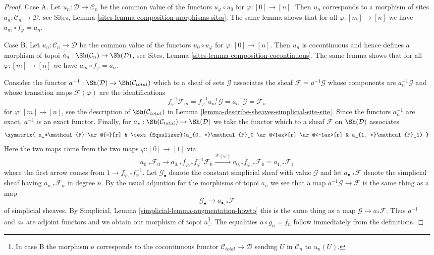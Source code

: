 \begin{proof}
Case A. Let $u_n : \mathcal{D} \to \mathcal{C}_n$ be the common
value of the functors $u_\varphi \circ u_0$ for $\varphi : [0] \to [n]$.
Then $u_n$ corresponds to a morphism of sites
$a_n : \mathcal{C}_n \to \mathcal{D}$, see
Sites, Lemma \ref{sites-lemma-composition-morphisms-sites}.
The same lemma shows that for all $\varphi : [m] \to [n]$ we have
$a_m \circ f_\varphi = a_n$.

\medskip\noindent
Case B. Let $u_n : \mathcal{C}_n \to \mathcal{D}$ be the common
value of the functors $u_0 \circ u_\varphi$ for $\varphi : [0] \to [n]$.
Then $u_n$ is cocontinuous and hence defines a morphism of topoi
$a_n : \Sh(\mathcal{C}_n) \to \Sh(\mathcal{D)}$, see
Sites, Lemma \ref{sites-lemma-composition-cocontinuous}.
The same lemma shows that for all $\varphi : [m] \to [n]$ we have
$a_m \circ f_\varphi = a_n$.

\medskip\noindent
Consider the functor $a^{-1} : \Sh(\mathcal{D}) \to \Sh(\mathcal{C}_{total})$
which to a sheaf of sets $\mathcal{G}$ associates the sheaf
$\mathcal{F} = a^{-1}\mathcal{G}$ whose components are $a_n^{-1}\mathcal{G}$
and whose transition maps $\mathcal{F}(\varphi)$ are the identifications
$$
f_\varphi^{-1}\mathcal{F}_m =
f_\varphi^{-1} a_m^{-1}\mathcal{G} =
a_n^{-1}\mathcal{G} =
\mathcal{F}_n
$$
for $\varphi : [m] \to [n]$, see the description of
$\Sh(\mathcal{C}_{total})$ in
Lemma \ref{lemma-describe-sheaves-simplicial-site-site}.
Since the functors $a_n^{-1}$ are exact, $a^{-1}$ is an exact functor.
Finally, for $a_* : \Sh(\mathcal{C}_{total}) \to \Sh(\mathcal{D})$
we take the functor which to a sheaf $\mathcal{F}$ on $\Sh(\mathcal{D})$
associates
$$
\xymatrix{
a_*\mathcal{F} \ar@{=}[r] &
\text{Equalizer}(a_{0, *}\mathcal{F}_0
\ar@<1ex>[r] \ar@<-1ex>[r] &
a_{1, *}\mathcal{F}_1)
}
$$
Here the two maps come from the two maps $\varphi : [0] \to [1]$
via
$$
a_{0, *}\mathcal{F}_0 \to
a_{0, *}f_{\varphi, *} f_\varphi^{-1}\mathcal{F}_0
\xrightarrow{\mathcal{F}(\varphi)}
a_{0, *}f_{\varphi, *} \mathcal{F}_0 = a_{1, *}\mathcal{F}_1
$$
where the first arrow comes from $1 \to f_{\varphi, *} f_\varphi^{-1}$.
Let $\mathcal{G}_\bullet$ denote the constant simplicial sheaf
with value $\mathcal{G}$ and let $a_{\bullet, *}\mathcal{F}$
denote the simplicial sheaf having $a_{n, *}\mathcal{F}_n$ in degree $n$.
By the usual adjuntion for the morphisms of topoi $a_n$ we see that
a map $a^{-1}\mathcal{G} \to \mathcal{F}$
is the same thing as a map
$$
\mathcal{G}_\bullet \longrightarrow a_{\bullet, *}\mathcal{F}
$$
of simplicial sheaves.
By Simplicial, Lemma \ref{simplicial-lemma-augmentation-howto}
this is the same thing as a map $\mathcal{G} \to a_*\mathcal{F}$.
Thus $a^{-1}$ and $a_*$ are adjoint functors and we obtain
our morphism of topoi $a$\footnote{In case B the morphism $a$
corresponds to the cocontinuous functor
$\mathcal{C}_{total} \to \mathcal{D}$ sending
$U$ in $\mathcal{C}_n$ to $u_n(U)$.}. The equalities
$a \circ g_n = f_n$ follow immediately from the definitions.
\end{proof}



